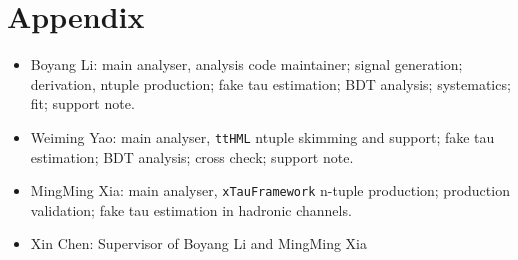 \documentclass[UKenglish,texlive=2020]{\ATLASLATEXPATH atlasdoc}
\begin{document}
\maketitle

\tableofcontents

\newpage

\linenumbers










\clearpage
\appendix
\part*{Appendix}






%
%
%
%
%
%
%
\clearpage

\printbibliography
%
%

\clearpage
{}

\begin{itemize}
\item Boyang Li: main analyser, analysis code maintainer; signal generation; derivation, ntuple production; fake tau estimation; BDT analysis; systematics; fit; support note.
\item Weiming Yao: main analyser, \texttt{ttHML} ntuple skimming and support; fake tau estimation; BDT analysis; cross check; support note.
\item MingMing Xia: main analyser, \texttt{xTauFramework} n-tuple production; production validation; fake tau estimation in hadronic channels.
\item Xin Chen: Supervisor of Boyang Li and MingMing Xia
\end{itemize}
\end{document}
